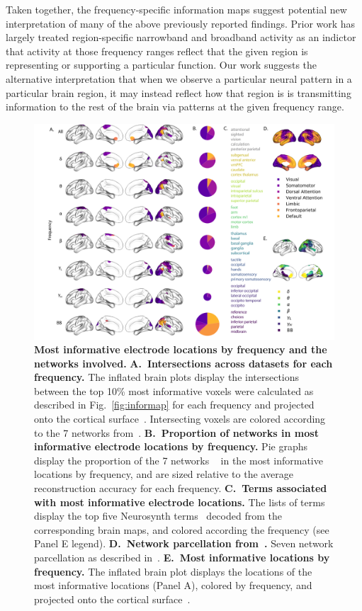 \documentclass[11pt]{article}
\begin{document}
Taken together, the frequency-specific information maps suggest potential new
interpretation of many of the above previously reported findings.  Prior work
has largely treated region-specific narrowband and broadband activity as an
indictor that activity at those frequency ranges reflect that the given region
is representing or supporting a particular function.  Our work suggests the
alternative interpretation that when we observe a particular neural pattern in a
particular brain region, it may instead reflect how that region is is transmitting
information to the rest of the brain via patterns at the given frequency range.

\begin{figure}
  \centering
  \includegraphics[width=\textwidth]{figs/networks}
  \caption{\textbf{Most informative electrode locations by frequency
      and the networks involved.}
    \textbf{A.~Intersections across datasets for each frequency.} The
    inflated brain plots display the intersections between the
    top 10\% most informative voxels were calculated as described in Fig.~\ref{fig:informap}
    for each frequency and projected onto the cortical surface~\citep{CombEtal19}. Intersecting voxels are colored according to the 7 networks
    from~\citep{YeoEtal11}.
    \textbf{B.~Proportion of networks in most informative electrode locations by
    frequency.}  Pie graphs display the proportion of the 7 networks
  ~\citep{YeoEtal11} in the most informative locations by
  frequency, and are sized relative to the average reconstruction
  accuracy for each frequency. \textbf{C.~Terms associated with most informative
    electrode locations.}  The
    lists of terms display the top five Neurosynth
    terms~\citep{RubiEtal17} decoded from the corresponding brain
    maps, and colored according the frequency (see Panel
    E legend). \textbf{D.~Network parcellation from~\citep{YeoEtal11}.}
    Seven network parcellation as described
    in~\citep{YeoEtal11}. \textbf{E.~Most informative locations by
      frequency.} The inflated brain plot displays the locations of
    the most informative locations (Panel A), colored by frequency,
    and projected onto the cortical surface~\citep{CombEtal19}.}
  \label{fig:networks}
\end{figure}
\end{document}
